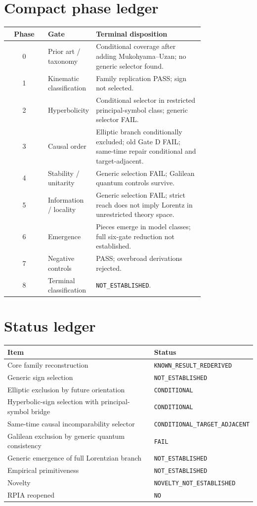\documentclass[11pt,a4paper]{article}
\newcommand{\status}[1]{\texttt{#1}}
\begin{document}
\section{Compact phase ledger}
\begin{longtable}{c>{\raggedright\arraybackslash}p{0.24\linewidth}>{\raggedright\arraybackslash}p{0.55\linewidth}}
\toprule
Phase & Gate & Terminal disposition \\
\midrule
0 & Prior art / taxonomy & Conditional coverage after adding Mukohyama--Uzan; no generic selector found. \\
1 & Kinematic classification & Family replication PASS; sign not selected. \\
2 & Hyperbolicity & Conditional selector in restricted principal-symbol class; generic selector FAIL. \\
3 & Causal order & Elliptic branch conditionally excluded; old Gate D FAIL; same-time repair conditional and target-adjacent. \\
4 & Stability / unitarity & Generic selection FAIL; Galilean quantum controls survive. \\
5 & Information / locality & Generic selection FAIL; strict reach does not imply Lorentz in unrestricted theory space. \\
6 & Emergence & Pieces emerge in model classes; full six-gate reduction not established. \\
7 & Negative controls & PASS; overbroad derivations rejected. \\
8 & Terminal classification & \status{NOT\_ESTABLISHED}. \\
\bottomrule
\end{longtable}

\section{Status ledger}
\begin{center}
\begin{tabular}{ll}
\toprule
Item & Status \\
\midrule
Core family reconstruction & \status{KNOWN\_RESULT\_REDERIVED} \\
Generic sign selection & \status{NOT\_ESTABLISHED} \\
Elliptic exclusion by future orientation & \status{CONDITIONAL} \\
Hyperbolic-sign selection with principal-symbol bridge & \status{CONDITIONAL} \\
Same-time causal incomparability selector & \status{CONDITIONAL\_TARGET\_ADJACENT} \\
Galilean exclusion by generic quantum consistency & \status{FAIL} \\
Generic emergence of full Lorentzian branch & \status{NOT\_ESTABLISHED} \\
Empirical primitiveness & \status{NOT\_ESTABLISHED} \\
Novelty & \status{NOVELTY\_NOT\_ESTABLISHED} \\
RPIA reopened & \status{NO} \\
\bottomrule
\end{tabular}
\end{center}
\end{document}
